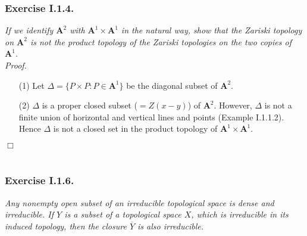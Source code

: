 \documentclass{article}
\begin{document}



\subsubsection*{Exercise I.1.4.}
\emph{If we identify $\mathbf{A}^2$ with $\mathbf{A}^1 \times \mathbf{A}^1$
in the natural way, show that the Zariski topology on $\mathbf{A}^2$
is not the product topology of the Zariski topologies on the two copies of $\mathbf{A}^1$.} \\



\emph{Proof.}
\begin{enumerate}
\item[(1)]
  Let $\Delta = \{ P \times P : P \in \mathbf{A}^1 \}$ be the diagonal subset of $\mathbf{A}^2$.

\item[(2)]
  $\Delta$ is a proper closed subset ($= Z(x-y)$) of $\mathbf{A}^2$.
  However, $\Delta$ is not a finite union of horizontal and vertical lines and points
  (Example I.1.1.2).
  Hence $\Delta$ is not a closed set in the product topology of $\mathbf{A}^1 \times \mathbf{A}^1$.
\end{enumerate}
$\Box$ \\\\






\subsubsection*{Exercise I.1.6.}
\emph{Any nonempty open subset of an irreducible topological space is dense and irreducible.
If $Y$ is a subset of a topological space $X$, which is irreducible in its induced topology,
then the closure $\overline{Y}$ is also irreducible.} \\
\end{document}
